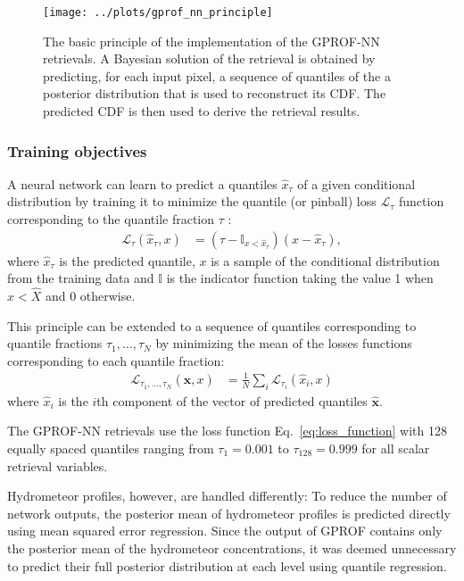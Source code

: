 \documentclass[a4paper,11pt,bibtotoc]{scrartcl}
\begin{document}
\begin{figure}[hbpt]
  \centering
  \texttt{[image: ../plots/gprof\_nn\_principle]}
  \caption{The basic principle of the implementation of the GPROF-NN retrievals.
    A Bayesian solution of the retrieval is obtained by predicting, for each
    input pixel, a sequence of quantiles of the a posterior distribution that is
    used to reconstruct its CDF. The predicted CDF is then used to derive the
    retrieval results.}
  \label{fig:gprof_nn_principle}
\end{figure}

\subsubsection{Training objectives}
\label{sec:objectives}

A neural network can learn to predict a quantiles $\hat{x}_\tau$ of
a given conditional distribution by training it to minimize the quantile (or pinball) loss
$\mathcal{L_\tau}$ function corresponding to the quantile
fraction $\tau$ \citep{koenker01}:
\begin{align}\label{eq:quantile_loss}
  \mathcal{L}_\tau(\hat{x}_\tau, x) &= (\tau - \mathbb{I}_{x < \hat{x}_\tau})(x
  - \hat{x}_\tau),
\end{align}
where $\hat{x}_\tau$ is the predicted quantile, $x$ is a sample of the
conditional distribution from the training data and $\mathbb{I}$ is the
indicator function taking the value 1 when $x < \hat{X}$ and 0 otherwise.

This principle can be extended to a sequence of quantiles corresponding to
quantile fractions $\tau_1, \ldots, \tau_N$ by minimizing the mean of the losses
functions corresponding to each quantile fraction:
\begin{align}\label{eq:loss_function}
  \mathcal{L}_{\tau_1,\ldots, \tau_N}(\hat{\mathbf{x}}, x) &= \frac{1}{N} \sum_i
  \mathcal{L}_{\tau_i}(\hat{x}_i, x)
\end{align}
where $\hat{x}_i$ is the $i$th component of the vector of predicted quantiles
$\hat{\mathbf{x}}$.

The GPROF-NN retrievals use the loss function Eq.~\ref{eq:loss_function} with
128 equally spaced quantiles ranging from $\tau_1 = 0.001$ to $\tau_{128} =
0.999$ for all scalar retrieval variables.

Hydrometeor profiles, however, are handled differently: To reduce the number of
network outputs, the posterior mean of hydrometeor profiles is predicted
directly using mean squared error regression. Since the output of GPROF contains
only the posterior mean of the hydrometeor concentrations, it was deemed
unnecessary to predict their full posterior distribution at each level using
quantile regression.
\end{document}
